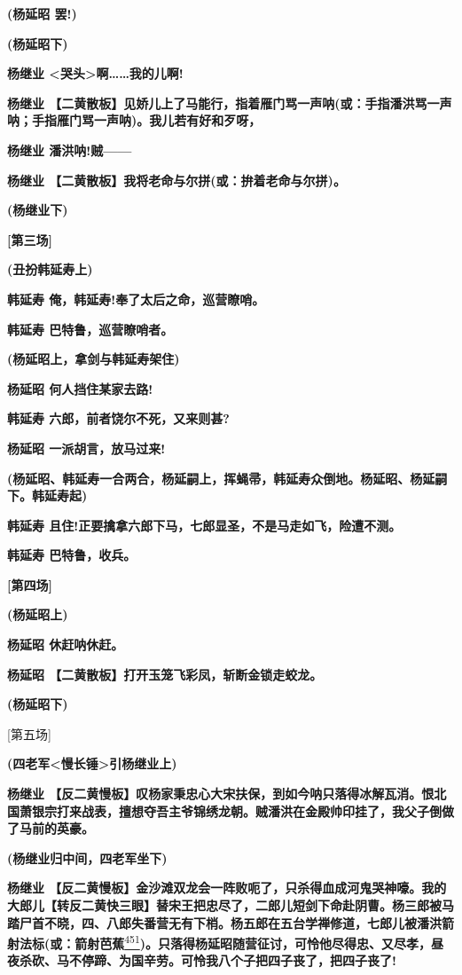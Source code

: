 \textbf{(杨延昭 罢!)}

\textbf{(杨延昭下)}

\textbf{杨继业 \textless{}哭头\textgreater{}啊\ldots{}\ldots{}我的儿啊!}

\textbf{杨继业
【二黄散板】见娇儿上了马能行，指着雁门骂一声呐(或：手指潘洪骂一声呐；手指雁门骂一声呐)。我儿若有好和歹呀，}

\textbf{杨继业 潘洪呐!贼------}

\textbf{杨继业 【二黄散板】我将老命与尔拼(或：拚着老命与尔拼)。}

\textbf{(杨继业下)}

\textbf{{[}第三场{]}}

\textbf{(丑扮韩延寿上)}

\textbf{韩延寿 俺，韩延寿!奉了太后之命，巡营瞭哨。}

\textbf{韩延寿 巴特鲁，巡营瞭哨者。}

\textbf{(杨延昭上，拿剑与韩延寿架住)}

\textbf{杨延昭 何人挡住某家去路!}

\textbf{韩延寿 六郎，前者饶尔不死，又来则甚?}

\textbf{杨延昭 一派胡言，放马过来!}

\textbf{(杨延昭、韩延寿一合两合，杨延嗣上，挥蝇帚，韩延寿众倒地。杨延昭、杨延嗣下。韩延寿起)}

\textbf{韩延寿
且住!正要擒拿六郎下马，七郎显圣，不是马走如飞，险遭不测。}

\textbf{韩延寿 巴特鲁，收兵。}

\textbf{{[}第四场{]}}

\textbf{(杨延昭上)}

\textbf{杨延昭 休赶呐休赶。}

\textbf{杨延昭 【二黄散板】打开玉笼飞彩凤，斩断金锁走蛟龙。}

\textbf{(杨延昭下)}

{[}第五场{]}

\textbf{(四老军\textless{}慢长锤\textgreater{}引杨继业上)}

\textbf{杨继业
【反二黄慢板】叹杨家秉忠心大宋扶保，到如今呐只落得冰解瓦消。恨北国萧银宗打来战表，擅想夺吾主爷锦绣龙朝。贼潘洪在金殿帅印挂了，我父子倒做了马前的英豪。}

\textbf{(杨继业归中间，四老军坐下)}

\textbf{杨继业
【反二黄慢板】金沙滩双龙会一阵败呃了，只杀得血成河鬼哭神嚎。我的大郎儿【转反二黄快三眼】替宋王把忠尽了，二郎儿短剑下命赴阴曹。杨三郎被马踏尸首不晓，四、八郎失番营无有下梢。杨五郎在五台学禅修道，七郎儿被潘洪箭射法标(或：箭射芭蕉}\protect\hyperlink{fn451}{\textsuperscript{451}}\textbf{)。只落得杨延昭随营征讨，可怜他尽得忠、又尽孝，昼夜杀砍、马不停蹄、为国辛劳。可怜我八个子把四子丧了，把四子丧了!}

